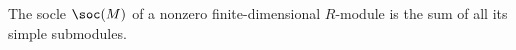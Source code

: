 The socle $\soc(M)$ of a nonzero finite-dimensional $R$-module is the sum of
all its simple submodules.
